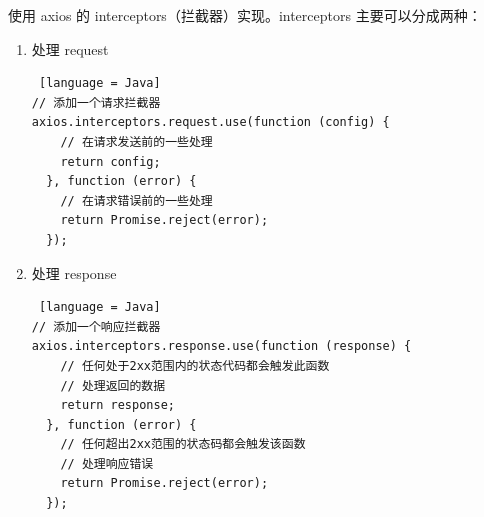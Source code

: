 使用 axios 的 interceptors（拦截器）实现。interceptors 主要可以分成两种：
\begin{enumerate}
  \item 处理 request
        \begin{lstlisting} [language = Java]
// 添加一个请求拦截器
axios.interceptors.request.use(function (config) {
    // 在请求发送前的一些处理
    return config;
  }, function (error) {
    // 在请求错误前的一些处理
    return Promise.reject(error);
  });

                \end{lstlisting}
  \item 处理 response
        \begin{lstlisting} [language = Java]
// 添加一个响应拦截器
axios.interceptors.response.use(function (response) {
    // 任何处于2xx范围内的状态代码都会触发此函数
    // 处理返回的数据
    return response;
  }, function (error) {
    // 任何超出2xx范围的状态码都会触发该函数
    // 处理响应错误
    return Promise.reject(error);
  });
\end{lstlisting}
\end{enumerate}























